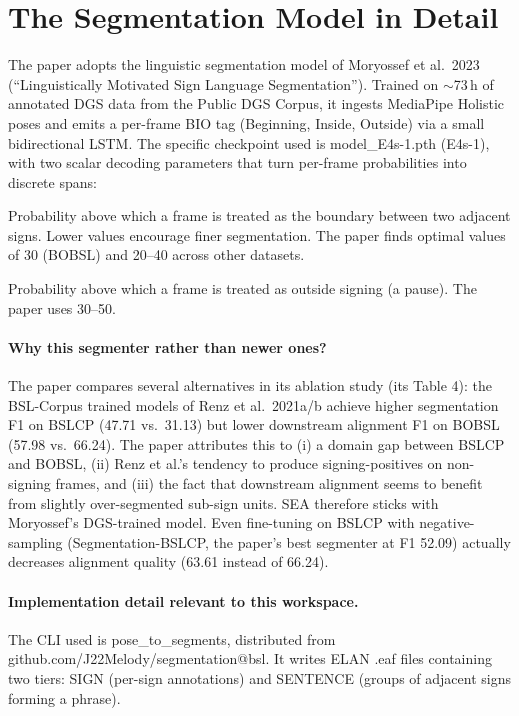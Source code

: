 \documentclass[11pt,a4paper]{article}
\def\texttt#1{#1}%
\def\emph#1{#1}%
\begin{document}
\section{The Segmentation Model in Detail}
\label{sec:paper-seg}

The paper adopts the linguistic segmentation model of Moryossef et al.\ 2023
(\emph{``Linguistically Motivated Sign Language Segmentation''}). Trained on
$\sim$73\,h of annotated DGS data from the Public DGS Corpus, it ingests
MediaPipe Holistic poses and emits a per-frame BIO tag (\textsc{B}eginning,
\textsc{I}nside, \textsc{O}utside) via a small bidirectional LSTM. The
specific checkpoint used is \texttt{model\_E4s-1.pth} (\texttt{E4s-1}), with
two scalar decoding parameters that turn per-frame probabilities into discrete
spans:
\begin{description}[leftmargin=1.6em,style=nextline]
  \item[\texttt{b-threshold} (range 0--100)] Probability above which a frame
  is treated as the boundary between two adjacent signs. Lower values
  encourage finer segmentation. The paper finds optimal values of 30 (BOBSL)
  and 20--40 across other datasets.
  \item[\texttt{o-threshold} (range 0--100)] Probability above which a frame
  is treated as outside signing (a pause). The paper uses 30--50.
\end{description}

\paragraph{Why this segmenter rather than newer ones?} The paper compares
several alternatives in its ablation study (its Table 4): the BSL-Corpus
trained models of Renz et al.\ 2021a/b achieve higher \emph{segmentation} F1
on BSLCP (47.71 vs.\ 31.13) but \emph{lower downstream alignment} F1 on BOBSL
(57.98 vs.\ 66.24). The paper attributes this to (i) a domain gap between
BSLCP and BOBSL, (ii) Renz et al.'s tendency to produce signing-positives on
non-signing frames, and (iii) the fact that downstream alignment seems to
benefit from \emph{slightly over-segmented} sub-sign units. SEA therefore
sticks with Moryossef's DGS-trained model. Even fine-tuning on BSLCP with
negative-sampling (\emph{Segmentation-BSLCP}, the paper's best segmenter at
F1 52.09) actually \emph{decreases} alignment quality (63.61 instead of
66.24).

\paragraph{Implementation detail relevant to this workspace.} The CLI used is
\texttt{pose\_to\_segments}, distributed from
\texttt{github.com/J22Melody/segmentation@bsl}. It writes ELAN \texttt{.eaf}
files containing two tiers: \texttt{SIGN} (per-sign annotations) and
\texttt{SENTENCE} (groups of adjacent signs forming a phrase).
\end{document}
